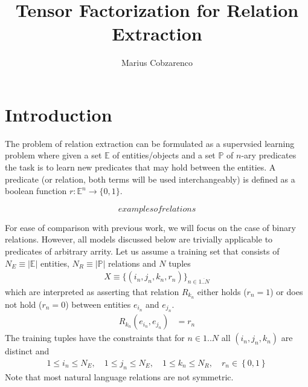 \documentclass[a4paper, 11pt, fleqn]{article}
\begin{document}
 \title{Tensor Factorization for Relation Extraction}
\author{Marius Cobzarenco}
\maketitle

\section{Introduction}
The problem of relation extraction can be formulated as a supervsied
learning problem where given a set $\mathbb{E}$ of entities/objects
and a set $\mathbb{P}$ of $n$-ary predicates the task is to learn new
predicates that may hold between the entities. A predicate (or
relation, both terms will be used interchangeably) is defined as a
boolean function $r:\mathbb{E}^n \rightarrow \{0, 1\}$.

\[examples of relations\]

For ease of comparison with previous work, we will focus on the case
of binary relations. However, all models discussed below are trivially
applicable to predicates of arbitrary arrity. Let us assume a training
set that consists of $ N_E \equiv \vert\mathbb{E}\vert$ entities, $N_R
\equiv \vert\mathbb{P}\vert$ relations and $N$ tuples
\begin{align}
X \equiv \{(i_n, j_n, k_n, r_n)\}_{n\in\overline{1..N}}
\end{align}
which are interpreted as asserting that relation $R_{k_n}$ either
holds ($r_n = 1$) or does not hold ($r_n = 0$) between entities
$e_{i_n}$ and $e_{j_n}$.
\begin{align}
R_{k_n}(e_{i_n}, e_{j_n}) &= r_n
\end{align}
The training tuples have the constraints that for $n\in{1..N}$ all
$(i_n, j_n, k_n)$ are distinct and
\begin{align}
1 \leq i_n \leq N_E, \quad 1 \leq j_n \leq N_E, \quad
1 \leq k_n \leq N_R,\quad r_n \in \left\{0, 1\right\}
\end{align}
Note that most natural language relations are not symmetric.

\begin{figure}[t]
\begin{center}
\end{center}
\end{figure}
\end{document}
